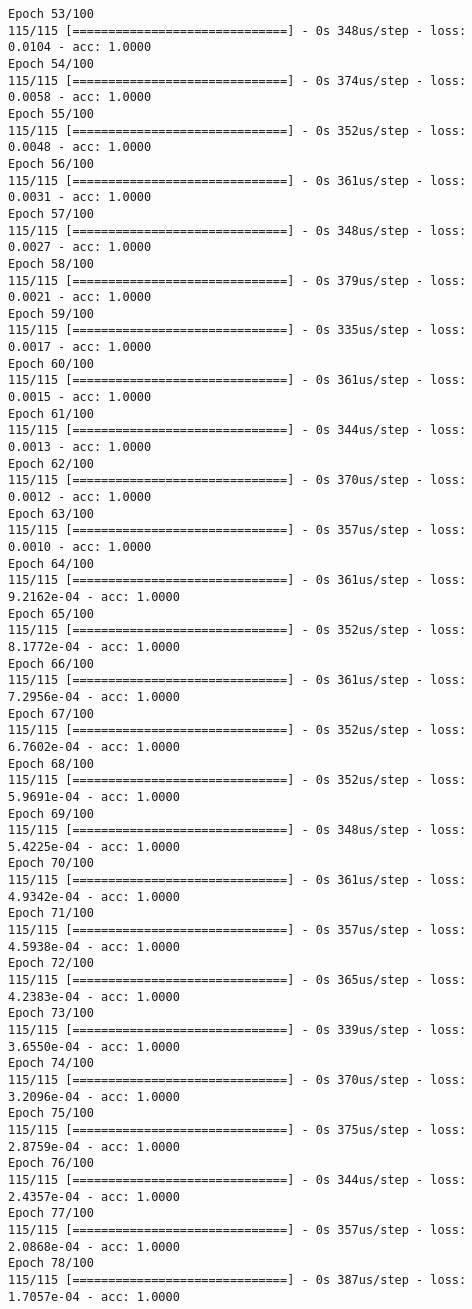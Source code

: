 \documentclass[11pt]{article}
\begin{document}
\begin{Verbatim}[commandchars=\\\{\}]
Epoch 53/100
115/115 [==============================] - 0s 348us/step - loss: 0.0104 - acc: 1.0000
Epoch 54/100
115/115 [==============================] - 0s 374us/step - loss: 0.0058 - acc: 1.0000
Epoch 55/100
115/115 [==============================] - 0s 352us/step - loss: 0.0048 - acc: 1.0000
Epoch 56/100
115/115 [==============================] - 0s 361us/step - loss: 0.0031 - acc: 1.0000
Epoch 57/100
115/115 [==============================] - 0s 348us/step - loss: 0.0027 - acc: 1.0000
Epoch 58/100
115/115 [==============================] - 0s 379us/step - loss: 0.0021 - acc: 1.0000
Epoch 59/100
115/115 [==============================] - 0s 335us/step - loss: 0.0017 - acc: 1.0000
Epoch 60/100
115/115 [==============================] - 0s 361us/step - loss: 0.0015 - acc: 1.0000
Epoch 61/100
115/115 [==============================] - 0s 344us/step - loss: 0.0013 - acc: 1.0000
Epoch 62/100
115/115 [==============================] - 0s 370us/step - loss: 0.0012 - acc: 1.0000
Epoch 63/100
115/115 [==============================] - 0s 357us/step - loss: 0.0010 - acc: 1.0000
Epoch 64/100
115/115 [==============================] - 0s 361us/step - loss: 9.2162e-04 - acc: 1.0000
Epoch 65/100
115/115 [==============================] - 0s 352us/step - loss: 8.1772e-04 - acc: 1.0000
Epoch 66/100
115/115 [==============================] - 0s 361us/step - loss: 7.2956e-04 - acc: 1.0000
Epoch 67/100
115/115 [==============================] - 0s 352us/step - loss: 6.7602e-04 - acc: 1.0000
Epoch 68/100
115/115 [==============================] - 0s 352us/step - loss: 5.9691e-04 - acc: 1.0000
Epoch 69/100
115/115 [==============================] - 0s 348us/step - loss: 5.4225e-04 - acc: 1.0000
Epoch 70/100
115/115 [==============================] - 0s 361us/step - loss: 4.9342e-04 - acc: 1.0000
Epoch 71/100
115/115 [==============================] - 0s 357us/step - loss: 4.5938e-04 - acc: 1.0000
Epoch 72/100
115/115 [==============================] - 0s 365us/step - loss: 4.2383e-04 - acc: 1.0000
Epoch 73/100
115/115 [==============================] - 0s 339us/step - loss: 3.6550e-04 - acc: 1.0000
Epoch 74/100
115/115 [==============================] - 0s 370us/step - loss: 3.2096e-04 - acc: 1.0000
Epoch 75/100
115/115 [==============================] - 0s 375us/step - loss: 2.8759e-04 - acc: 1.0000
Epoch 76/100
115/115 [==============================] - 0s 344us/step - loss: 2.4357e-04 - acc: 1.0000
Epoch 77/100
115/115 [==============================] - 0s 357us/step - loss: 2.0868e-04 - acc: 1.0000
Epoch 78/100
115/115 [==============================] - 0s 387us/step - loss: 1.7057e-04 - acc: 1.0000

\end{Verbatim}
\end{document}
